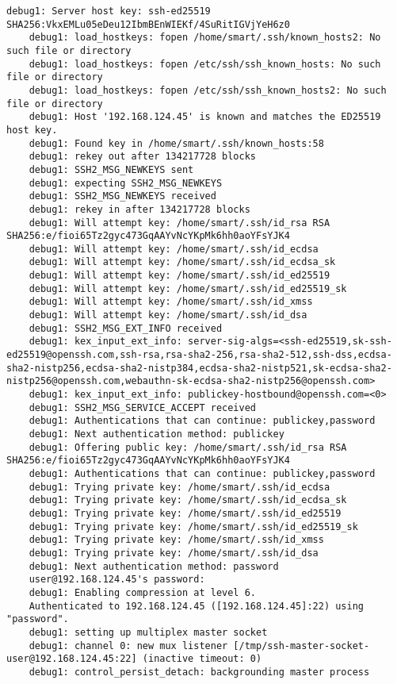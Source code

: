 \begin{Verbatim}[frame=single,breaklines=true,breakanywhere=true]
    debug1: Server host key: ssh-ed25519 SHA256:VkxEMLu05eDeu12IbmBEnWIEKf/4SuRitIGVjYeH6z0
    debug1: load_hostkeys: fopen /home/smart/.ssh/known_hosts2: No such file or directory
    debug1: load_hostkeys: fopen /etc/ssh/ssh_known_hosts: No such file or directory
    debug1: load_hostkeys: fopen /etc/ssh/ssh_known_hosts2: No such file or directory
    debug1: Host '192.168.124.45' is known and matches the ED25519 host key.
    debug1: Found key in /home/smart/.ssh/known_hosts:58
    debug1: rekey out after 134217728 blocks
    debug1: SSH2_MSG_NEWKEYS sent
    debug1: expecting SSH2_MSG_NEWKEYS
    debug1: SSH2_MSG_NEWKEYS received
    debug1: rekey in after 134217728 blocks
    debug1: Will attempt key: /home/smart/.ssh/id_rsa RSA SHA256:e/fioi65Tz2gyc473GqAAYvNcYKpMk6hh0aoYFsYJK4
    debug1: Will attempt key: /home/smart/.ssh/id_ecdsa 
    debug1: Will attempt key: /home/smart/.ssh/id_ecdsa_sk 
    debug1: Will attempt key: /home/smart/.ssh/id_ed25519 
    debug1: Will attempt key: /home/smart/.ssh/id_ed25519_sk 
    debug1: Will attempt key: /home/smart/.ssh/id_xmss 
    debug1: Will attempt key: /home/smart/.ssh/id_dsa 
    debug1: SSH2_MSG_EXT_INFO received
    debug1: kex_input_ext_info: server-sig-algs=<ssh-ed25519,sk-ssh-ed25519@openssh.com,ssh-rsa,rsa-sha2-256,rsa-sha2-512,ssh-dss,ecdsa-sha2-nistp256,ecdsa-sha2-nistp384,ecdsa-sha2-nistp521,sk-ecdsa-sha2-nistp256@openssh.com,webauthn-sk-ecdsa-sha2-nistp256@openssh.com>
    debug1: kex_input_ext_info: publickey-hostbound@openssh.com=<0>
    debug1: SSH2_MSG_SERVICE_ACCEPT received
    debug1: Authentications that can continue: publickey,password
    debug1: Next authentication method: publickey
    debug1: Offering public key: /home/smart/.ssh/id_rsa RSA SHA256:e/fioi65Tz2gyc473GqAAYvNcYKpMk6hh0aoYFsYJK4
    debug1: Authentications that can continue: publickey,password
    debug1: Trying private key: /home/smart/.ssh/id_ecdsa
    debug1: Trying private key: /home/smart/.ssh/id_ecdsa_sk
    debug1: Trying private key: /home/smart/.ssh/id_ed25519
    debug1: Trying private key: /home/smart/.ssh/id_ed25519_sk
    debug1: Trying private key: /home/smart/.ssh/id_xmss
    debug1: Trying private key: /home/smart/.ssh/id_dsa
    debug1: Next authentication method: password
    user@192.168.124.45's password: 
    debug1: Enabling compression at level 6.
    Authenticated to 192.168.124.45 ([192.168.124.45]:22) using "password".
    debug1: setting up multiplex master socket
    debug1: channel 0: new mux listener [/tmp/ssh-master-socket-user@192.168.124.45:22] (inactive timeout: 0)
    debug1: control_persist_detach: backgrounding master process

\end{Verbatim}
